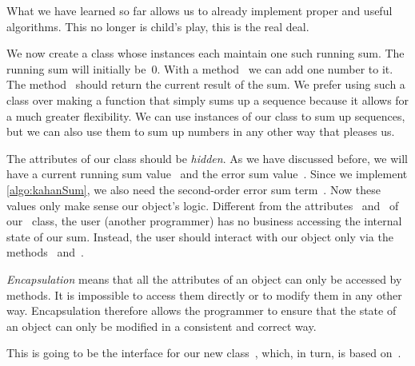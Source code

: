 What we have learned so far allows us to already implement proper and useful algorithms.
This no longer is child's play, this is the real deal.

We now create a class whose instances each maintain one such running sum.
The running sum will initially be~0.
With a method~ we can add one number to it.
The method~ should return the current result of the sum.
We prefer using such a class over making a function that simply sums up a sequence because it allows for a much greater flexibility.
We can use instances of our class to sum up sequences, but we can also use them to sum up numbers in any other way that pleases us.

The attributes of our class should be \emph{hidden}.
As we have discussed before, we will have a current running sum value~ and the error sum value~.
Since we implement \cref{algo:kahanSum}, we also need the second-order error sum term~.
Now these values only make sense  our object's logic.
Different from the attributes~ and~ of our~ class, the user (another programmer) has no business accessing the internal state of our sum.
Instead, the user should interact with our object only via the methods~ and~.%
%
\begin{definition}[Encapsulation]%
\emph{Encapsulation} means that all the attributes of an object can only be accessed by methods. %
It is impossible to access them directly or to modify them in any other way. %
Encapsulation therefore allows the programmer to ensure that the state of an object can only be modified in a consistent and correct way.%
\end{definition}%
%
This is going to be the interface for our new class~, which, in turn, is based on~\cite{K2006AGKBSA}.

